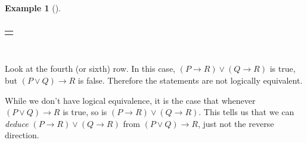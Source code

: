 \documentclass[10pt,]{book}
\theoremstyle{plain}
\theoremstyle{definition}
\theoremstyle{definition}
\newtheorem{example}[theorem]{Example}
\theoremstyle{definition}
\numberwithin{equation}{chapter}
\newlength{\panelmax}
\def\imp{\rightarrow}
\begin{document}
\begin{example}[]
{{{{\begin{tabular}{cAcAcBcAc}
\end{tabular}
}}}
\ifdefined\phAtabular\else\newlength{\phAtabular}\fi%
\setlength{\phAtabular}{\ht\panelboxAtabular+\dp\panelboxAtabular}
\settototalheight{\phAtabular}{\usebox{\panelboxAtabular}}
\setlength{\panelmax}{\maxof{\panelmax}{\phAtabular}}
\leavevmode%
\setlength{\tabcolsep}{0\linewidth}
\par\medskip\noindent
\begin{tabular}{@{}*{1}{c}@{}}
\begin{minipage}[c][\panelmax][t]{1\linewidth}\usebox{\panelboxAtabular}\end{minipage}\end{tabular}\\
}%
\par
\hypertarget{p-2317}{}%
Look at the fourth (or sixth) row. In this case, \((P \imp R) \vee (Q \imp R)\) is true, but \((P \vee Q) \imp R\) is false. Therefore the statements are not logically equivalent.%
\par
\hypertarget{p-2318}{}%
While we don't have logical equivalence, it is the case that whenever \((P \vee Q) \imp R\) is true, so is \((P \imp R) \vee (Q \imp R)\).  This tells us that we can \emph{deduce} \((P \imp R) \vee (Q \imp R)\) from \((P \vee Q) \imp R\), just not the reverse direction.%
\end{example}
\typeout{************************************************}
\typeout{************************************************}
\end{document}

